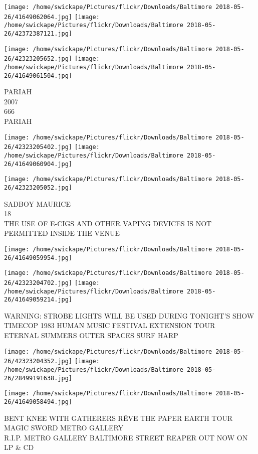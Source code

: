 \documentclass[10pt,letterpaper]{article}
\begin{document}
\texttt{[image: /home/swickape/Pictures/flickr/Downloads/Baltimore 2018-05-26/41649062064.jpg]}
\texttt{[image: /home/swickape/Pictures/flickr/Downloads/Baltimore 2018-05-26/42372387121.jpg]}

\texttt{[image: /home/swickape/Pictures/flickr/Downloads/Baltimore 2018-05-26/42323205652.jpg]}
\texttt{[image: /home/swickape/Pictures/flickr/Downloads/Baltimore 2018-05-26/41649061504.jpg]}

PARIAH\\
2007\\
666\\
PARIAH
\pagebreak

\texttt{[image: /home/swickape/Pictures/flickr/Downloads/Baltimore 2018-05-26/42323205402.jpg]}
\texttt{[image: /home/swickape/Pictures/flickr/Downloads/Baltimore 2018-05-26/41649060904.jpg]}

\texttt{[image: /home/swickape/Pictures/flickr/Downloads/Baltimore 2018-05-26/42323205052.jpg]}

SADBOY MAURICE\\
18\\
THE USE OF E{-}CIGS AND OTHER VAPING DEVICES IS NOT PERMITTED INSIDE THE VENUE
\pagebreak

\texttt{[image: /home/swickape/Pictures/flickr/Downloads/Baltimore 2018-05-26/41649059954.jpg]}

\vspace{0.25in}
\texttt{[image: /home/swickape/Pictures/flickr/Downloads/Baltimore 2018-05-26/42323204702.jpg]}
\texttt{[image: /home/swickape/Pictures/flickr/Downloads/Baltimore 2018-05-26/41649059214.jpg]}

WARNING: STROBE LIGHTS WILL BE USED DURING TONIGHT'S SHOW\\
TIMECOP 1983 HUMAN MUSIC FESTIVAL EXTENSION TOUR\\
ETERNAL SUMMERS OUTER SPACES SURF HARP
\pagebreak

\texttt{[image: /home/swickape/Pictures/flickr/Downloads/Baltimore 2018-05-26/42323204352.jpg]}
\texttt{[image: /home/swickape/Pictures/flickr/Downloads/Baltimore 2018-05-26/28499191638.jpg]}

\texttt{[image: /home/swickape/Pictures/flickr/Downloads/Baltimore 2018-05-26/41649058494.jpg]}

BENT KNEE WITH GATHERERS RÊVE THE PAPER EARTH TOUR\\
MAGIC SWORD METRO GALLERY\\
R.I.P. METRO GALLERY BALTIMORE STREET REAPER OUT NOW ON LP \& CD
\pagebreak
\end{document}

